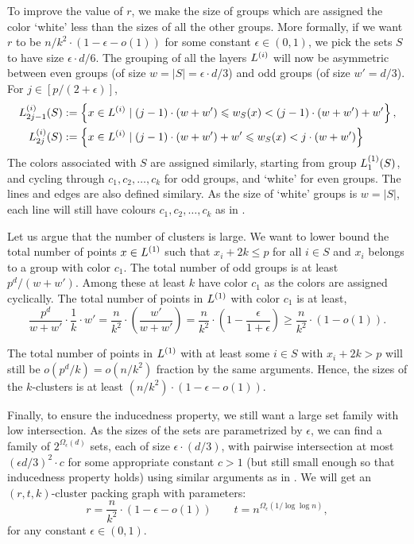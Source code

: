 \documentclass[11pt]{article}
\theoremstyle{definition}
\renewcommand{\leq}{\leqslant}
\renewcommand{\geq}{\geqslant}
\newcommand{\card}[1]{\left\vert{#1}\right\vert}
\newcommand{\set}[1]{\ensuremath{\left\{ #1 \right\}}}
\begin{document}
To improve the value of $r$, we make the size of groups which are assigned the color `white' less than the sizes of all the other groups. 
More formally, if we want $r $ to be $n/k^2 \cdot (1-\epsilon - o(1))$ for some constant $\epsilon \in (0,1)$, we pick the sets $S$ to have size $\epsilon \cdot d/6$. The grouping of all the layers $L^{(i)}$ will now be asymmetric between even groups (of size $w = \card{S} = \epsilon \cdot d/3$) and odd groups (of size $w' = d/3$). 
For $j \in [p/(2+\epsilon)]$,
 \begin{align*}
\LijS{i}{2j-1}{S} &:= \set{x \in \Li{i} \mid  (j-1)\cdot (w + w') \leq w_S(x) < (j-1)\cdot (w+w') + w'}, \\
\LijS{i}{2j}{S}&:= \set{x \in \Li{i} \mid (j-1) \cdot (w+w') + w' \leq w_S(x) < j \cdot (w + w')} 
\end{align*}
The colors associated with $S$ are assigned similarly, starting from group $L^{(1)}_{1}(S)$, and cycling through $c_1, c_2, \ldots, c_k$ for odd groups, and `white' for even groups. 
The lines and edges are also defined similary. 
As the size of `white' groups is $w = \card{S}$, each line will still have colours $c_1, c_2, \ldots, c_k$ as in .

Let us argue that the number of clusters is large. 
We want to lower bound the total number of points $x \in L^{(1)}$ such that $x_i + 2k \leq p$ for all $i \in S$ and $x_i$ belongs to a group with color $c_1$. 
The total number of odd groups is at least $p^d/(w+w')$. Among these at least $k$ have color $c_1$ as the colors are assigned cyclically. 
The total number of points in $L^{(1)}$ with color $c_1 $ is at least, 
\[
	\frac{p^d}{w + w'} \cdot \frac1{k} \cdot w' = \frac{n}{k^2} \cdot (\frac{w'}{w + w'}) = \frac{n}{k^2} \cdot (1- \frac{\epsilon}{1+\epsilon}) \geq \frac{n}{k^2} \cdot (1-o(1)).
\]

The total number of points in $L^{(1)}$ with at least some $i \in S$ with $x_i + 2k > p$ will still be $o(p^d/k) = o(n/k^2)$ fraction by the same arguments. Hence, the sizes of the $k$-clusters is at least $(n/k^2) \cdot (1-\epsilon - o(1))$.

Finally, to ensure the inducedness property, we still want a large set family with low intersection. As the sizes of the sets are parametrized by $\epsilon$, we can find a family of $2^{\Omega_{\epsilon}(d)}$ sets, each of size $\epsilon \cdot (d/3)$, with pairwise intersection at most $(\epsilon d/3)^2 \cdot c$ for some appropriate constant $c > 1$ (but still small enough so that inducedness property holds) using similar arguments as in . We will get an $(r,t,k)$-cluster packing graph with parameters:
\[
	r = \frac{n}{k^2} \cdot(1-\epsilon - o(1)) \qquad t = n^{\Omega_{\epsilon}(1/\log \log n)},
\]
for any constant $ \epsilon \in (0,1)$.
\end{document}
